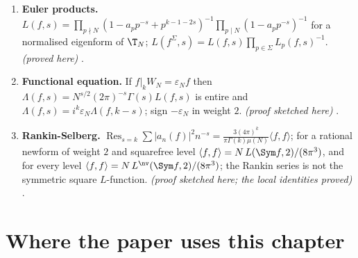 \begin{enumerate}[label=\textbf{\thechapter.\arabic*}]
divides the positive generator of $\eta^{\mathrm{Hecke}}(g^S)$, as integers, so $v_\ell(r_E)\le v_\ell(\eta^{\mathrm{Hecke}}(g^S))$ for every prime $\ell$. This is the inequality of the paper's Lemma lem:step1;
with the reverse inequality, proved there for $\ell\notin S$, it is an equality at every prime $\ell\notin S$. \emph{(proved here, given the twist lemmas of ; the equality
for $\ell\notin S$ in )} .
\item \textbf{Euler products.} $L(f,s)=\prod_{p\nmid N}(1-a_pp^{-s}+p^{k-1-2s})^{-1}\prod_{p\mid N}(1-a_pp^{-s})^{-1}$ for a normalised eigenform of $\T_N$; $L(f^\Sigma,s)=L(f,s)\prod_{p\in\Sigma}L_p(f,s)^{-1}$.
\emph{(proved here)} .
\item \textbf{Functional equation.} If $f|_kW_N=\varepsilon_Nf$ then $\Lambda(f,s)=N^{s/2}(2\pi)^{-s}\Gamma(s)L(f,s)$ is entire and $\Lambda(f,s)=i^k\varepsilon_N\Lambda(f,k-s)$; sign $-\varepsilon_N$ in
weight $2$. \emph{(proof sketched here)} .
\item \textbf{Rankin-Selberg.} $\operatorname{Res}_{s=k}\sum|a_n(f)|^2n^{-s}=\frac{3(4\pi)^k}{\pi\Gamma(k)\mu(N)}\langle f,f\rangle$; for a rational newform of weight $2$ and squarefree level
$\langle f,f\rangle=N\,L(\Sym f,2)/(8\pi^3)$, and for every level $\langle f,f\rangle=N\,L^{\nv}(\Sym f,2)/(8\pi^3)$; the Rankin series is not the symmetric square $L$-function. \emph{(proof sketched here; the local identities proved)}
.
\end{enumerate}

\section*{Where the paper uses this chapter}

